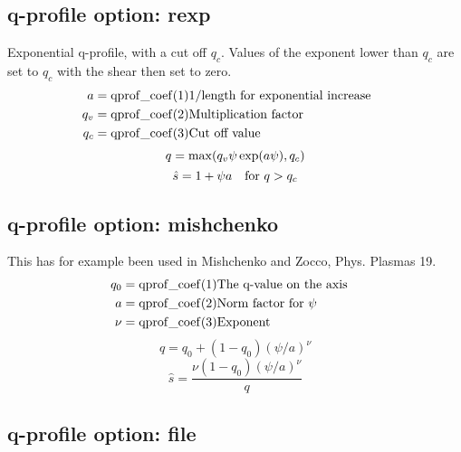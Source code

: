 \subsection{q-profile option: rexp} 

Exponential q-profile, with a cut off $q_c$. Values of the exponent lower than 
$q_c$ are set to $q_c$ with the shear then set to zero. 
\begin{eqnarray*}
a      = {\rm qprof\_coef}(1)   &\hbox{1/length for exponential increase } \cr
q_v    = {\rm qprof\_coef}(2)   &\hbox{Multiplication factor}\cr
q_c    = {\rm qprof\_coef}(3)   &\hbox{Cut off value}
\end{eqnarray*}
\begin{equation}
q = {\rm max}(q_v \psi \exp(a \psi),q_c) 
\end{equation}
\begin{equation}
\hat s = 1 + \psi a \quad \hbox{for $q>q_c$} 
\end{equation}

\subsection{q-profile option: mishchenko} 

This has for example been used in Mishchenko and Zocco, Phys. Plasmas 19. 
\begin{eqnarray*}
q_0      = {\rm qprof\_coef}(1)   &\hbox{The q-value on the axis} \cr
a        = {\rm qprof\_coef}(2)   &\hbox{Norm factor for $\psi$}\cr
\nu      = {\rm qprof\_coef}(3)   &\hbox{Exponent}
\end{eqnarray*}
\begin{equation}
q = q_0 + (1 - q_0) (\psi/ a)^\nu
\end{equation}
\begin{equation}
\hat s = \frac{\nu (1 - q_0) (\psi / a)^\nu }{ q} 
\end{equation}

\subsection{q-profile option: file} 

